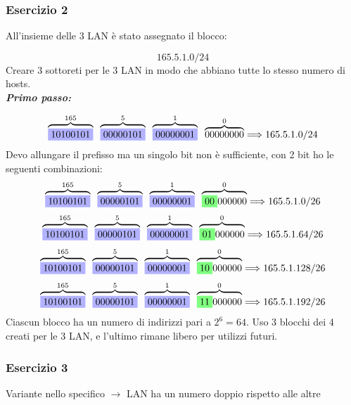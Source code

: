 \documentclass[a4paper]{article}
\begin{document}
\subsubsection{Esercizio 2}

All'insieme delle 3 LAN è stato assegnato il blocco:

\[165.5.1.0/24\]
Creare 3 sottoreti per le 3 LAN in modo che abbiano tutte lo stesso numero di hosts.\\
\textbf{\textit{Primo passo:}}

\[\overbrace{\colorbox{blue!30!white}{10100101}}^{165} \; \; \overbrace{\colorbox{blue!30!white}{00000101}}^{5} \; \; \overbrace{\colorbox{blue!30!white}{00000001}}^{1} \; \; \overbrace{00000000}^{0} \Longrightarrow 165.5.1.0/24\]
Devo allungare il prefisso ma un singolo bit non è sufficiente, con 2 bit ho le seguenti combinazioni: 
\[\overbrace{\colorbox{blue!30!white}{10100101}}^{165} \; \; \overbrace{\colorbox{blue!30!white}{00000101}}^{5} \; \; \overbrace{\colorbox{blue!30!white}{00000001}}^{1} \; \; \overbrace{\colorbox{green!50!white}{00}000000}^{0} \Longrightarrow 165.5.1.0/26\]
\[\overbrace{\colorbox{blue!30!white}{10100101}}^{165} \; \; \overbrace{\colorbox{blue!30!white}{00000101}}^{5} \; \; \overbrace{\colorbox{blue!30!white}{00000001}}^{1} \; \; \overbrace{\colorbox{green!50!white}{01}000000}^{0} \Longrightarrow 165.5.1.64/26\]
\[\overbrace{\colorbox{blue!30!white}{10100101}}^{165} \; \; \overbrace{\colorbox{blue!30!white}{00000101}}^{5} \; \; \overbrace{\colorbox{blue!30!white}{00000001}}^{1} \; \; \overbrace{\colorbox{green!50!white}{10}000000}^{0} \Longrightarrow 165.5.1.128/26\]
\[\overbrace{\colorbox{blue!30!white}{10100101}}^{165} \; \; \overbrace{\colorbox{blue!30!white}{00000101}}^{5} \; \; \overbrace{\colorbox{blue!30!white}{00000001}}^{1} \; \; \overbrace{\colorbox{green!50!white}{11}000000}^{0} \Longrightarrow 165.5.1.192/26\]
Ciascun blocco ha un numero di indirizzi pari a $2^6 = 64$. Uso 3 blocchi dei 4 creati per le 3 LAN, e l'ultimo rimane libero per utilizzi futuri.

\subsubsection{Esercizio 3}
Variante nello specifico $\rightarrow$ LAN ha un numero doppio rispetto alle altre 
\end{document}
